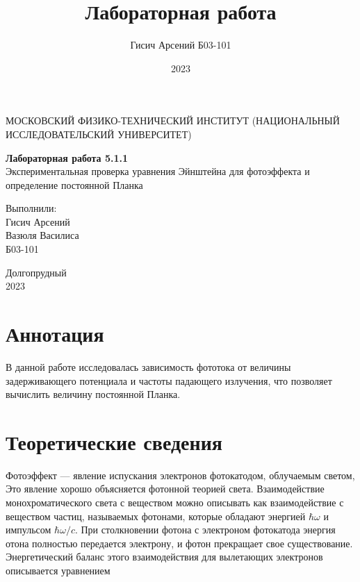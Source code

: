 \documentclass[a4paper, 12pt]{article}
\title{Лабораторная работа}
\author{Гисич Арсений Б03-101}
\date{2023}
\begin{document}
	\begin{center}
		{\large МОСКОВСКИЙ ФИЗИКО-ТЕХНИЧЕСКИЙ ИНСТИТУТ (НАЦИОНАЛЬНЫЙ ИССЛЕДОВАТЕЛЬСКИЙ УНИВЕРСИТЕТ)}
	\end{center}
	\vspace{5 cm}
	{\Large
		\begin{center}
			{\bf Лабораторная работа 5.1.1}\\[0.2 cm]
			Экспериментальная проверка уравнения Эйнштейна для фотоэффекта и определение постоянной Планка
		\end{center}
	}
	\vspace{4 cm}
	\begin{flushright}
		{\Large Выполнили: \\
			\vspace{0.2 cm}
			Гисич Арсений \\
            Вазюля Василиса \\ 
			\vspace{0.2 cm}
			Б03-101 \\}
	\end{flushright}
	\vspace{7 cm}
	\begin{center}
		Долгопрудный\\[0.1 cm]
		2023
	\end{center}
\thispagestyle{empty}

\section{Аннотация}

В данной работе исследовалась зависимость фототока от величины задерживающего потенциала и частоты падающего излучения, что позволяет вычислить величину постоянной Планка.

\section{Теоретические сведения}

Фотоэффект --- явление испускания электронов фотокатодом, облучаемым светом,  Это явление хорошо объясняется фотонной теорией света. Взаимодействие монохроматического света с веществом можно описывать
	как взаимодействие с веществом частиц, называемых фотонами, которые обладают энергией $ \hbar \omega $ и импульсом $ \hbar\omega/c $. При столкновении фотона с электроном фотокатода энергия отона полностью передается электрону, и фотон прекращает свое существование. Энергетический баланс этого взаимодействия для вылетающих электронов
	описывается уравнением
	
\end{document}
